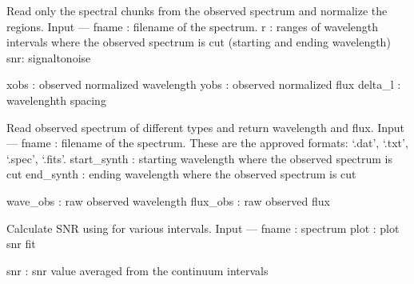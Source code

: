 \documentclass[letterpaper,10pt,english]{sphinxmanual}
\begin{document}

\begin{fulllineitems}
\label{\detokenize{index:FASMA.observations.read_obs_intervals}}
Read only the spectral chunks from the observed spectrum and normalize
the regions.
Input
—\textendash{}
fname : filename of the spectrum.
r : ranges of wavelength intervals where the observed spectrum is cut
(starting and ending wavelength)
snr: signal\sphinxhyphen{}to\sphinxhyphen{}noise

xobs : observed normalized wavelength
yobs : observed normalized flux
delta\_l : wavelenghth spacing

\end{fulllineitems}


\begin{fulllineitems}
\label{\detokenize{index:FASMA.observations.read_observations}}
Read observed spectrum of different types and return wavelength and flux.
Input
—\textendash{}
fname : filename of the spectrum. These are the approved formats: ‘.dat’, ‘.txt’,
‘.spec’, ‘.fits’.
start\_synth : starting wavelength where the observed spectrum is cut
end\_synth : ending wavelength where the observed spectrum is cut

wave\_obs : raw observed wavelength
flux\_obs : raw observed flux

\end{fulllineitems}


\begin{fulllineitems}
\label{\detokenize{index:FASMA.observations.snr}}
Calculate SNR using for various intervals.
Input
—\sphinxhyphen{}
fname : spectrum
plot : plot snr fit

snr : snr value averaged from the continuum intervals

\end{fulllineitems}
\end{document}

